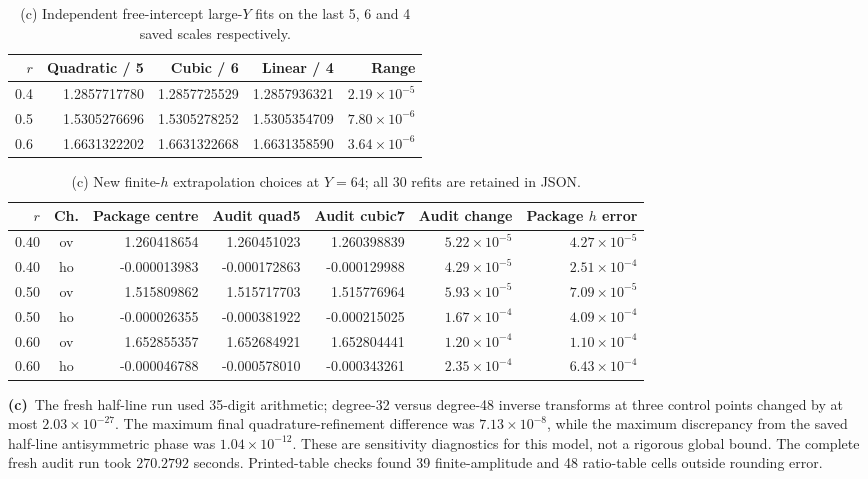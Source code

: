 \documentclass[11pt,a4paper]{article}
\newcommand{\Lc}{\textbf{(c)}\ }
\begin{document}
\begingroup\small\setlength{\tabcolsep}{4pt}
\begin{longtable}{@{}rrrrr@{}}
\caption{(c) Independent free-intercept large-$Y$ fits on the last 5, 6 and 4 saved scales respectively.}\\
\toprule $r$ & Quadratic / 5 & Cubic / 6 & Linear / 4 & Range\\\midrule\endhead
0.4 & 1.2857717780 & 1.2857725529 & 1.2857936321 & $2.19\times10^{-5}$\\
0.5 & 1.5305276696 & 1.5305278252 & 1.5305354709 & $7.80\times10^{-6}$\\
0.6 & 1.6631322202 & 1.6631322668 & 1.6631358590 & $3.64\times10^{-6}$\\
\bottomrule\end{longtable}\endgroup


\begingroup\small\setlength{\tabcolsep}{4pt}
\begin{longtable}{@{}rcrrrrr@{}}
\caption{(c) New finite-$h$ extrapolation choices at $Y=64$; all 30 refits are retained in JSON.}\\
\toprule $r$ & Ch. & Package centre & Audit quad5 & Audit cubic7 & Audit change & Package $h$ error\\\midrule\endhead
0.40 & ov & 1.260418654 & 1.260451023 & 1.260398839 & $5.22\times10^{-5}$ & $4.27\times10^{-5}$\\
0.40 & ho & -0.000013983 & -0.000172863 & -0.000129988 & $4.29\times10^{-5}$ & $2.51\times10^{-4}$\\
0.50 & ov & 1.515809862 & 1.515717703 & 1.515776964 & $5.93\times10^{-5}$ & $7.09\times10^{-5}$\\
0.50 & ho & -0.000026355 & -0.000381922 & -0.000215025 & $1.67\times10^{-4}$ & $4.09\times10^{-4}$\\
0.60 & ov & 1.652855357 & 1.652684921 & 1.652804441 & $1.20\times10^{-4}$ & $1.10\times10^{-4}$\\
0.60 & ho & -0.000046788 & -0.000578010 & -0.000343261 & $2.35\times10^{-4}$ & $6.43\times10^{-4}$\\
\bottomrule\end{longtable}\endgroup

\Lc The fresh half-line run used 35-digit arithmetic; degree-32 versus degree-48 inverse transforms at three control points changed by at most $2.03\times10^{-27}$. The maximum final quadrature-refinement difference was $7.13\times10^{-8}$, while the maximum discrepancy from the saved half-line antisymmetric phase was $1.04\times10^{-12}$. These are sensitivity diagnostics for this model, not a rigorous global bound. The complete fresh audit run took $270.2792$ seconds. Printed-table checks found 39 finite-amplitude and 48 ratio-table cells outside rounding error.
\end{document}
